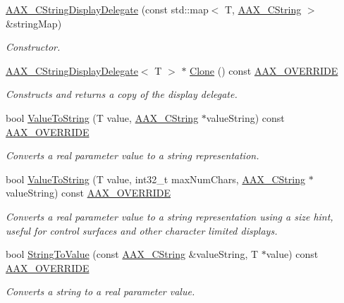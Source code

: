 \begin{DoxyCompactItemize}
\item 
\mbox{\hyperlink{a01581_a675d5d95e04e023b0650c621ddaf4972}{A\+A\+X\+\_\+\+C\+String\+Display\+Delegate}} (const std\+::map$<$ T, \mbox{\hyperlink{a01573}{A\+A\+X\+\_\+\+C\+String}} $>$ \&string\+Map)
\begin{DoxyCompactList}\small\item\em Constructor. \end{DoxyCompactList}\item 
\mbox{\hyperlink{a01581}{A\+A\+X\+\_\+\+C\+String\+Display\+Delegate}}$<$ T $>$ $\ast$ \mbox{\hyperlink{a01581_a011fc2e134ffa0469ee995232922bcb2}{Clone}} () const \mbox{\hyperlink{a00392_ac2f24a5172689ae684344abdcce55463}{A\+A\+X\+\_\+\+O\+V\+E\+R\+R\+I\+DE}}
\begin{DoxyCompactList}\small\item\em Constructs and returns a copy of the display delegate. \end{DoxyCompactList}\item 
bool \mbox{\hyperlink{a01581_a96ae6bc68f2a2df5224539b4b07f914b}{Value\+To\+String}} (T value, \mbox{\hyperlink{a01573}{A\+A\+X\+\_\+\+C\+String}} $\ast$value\+String) const \mbox{\hyperlink{a00392_ac2f24a5172689ae684344abdcce55463}{A\+A\+X\+\_\+\+O\+V\+E\+R\+R\+I\+DE}}
\begin{DoxyCompactList}\small\item\em Converts a real parameter value to a string representation. \end{DoxyCompactList}\item 
bool \mbox{\hyperlink{a01581_a5b5af0bb407230879e3cf7f952ad4de9}{Value\+To\+String}} (T value, int32\+\_\+t max\+Num\+Chars, \mbox{\hyperlink{a01573}{A\+A\+X\+\_\+\+C\+String}} $\ast$value\+String) const \mbox{\hyperlink{a00392_ac2f24a5172689ae684344abdcce55463}{A\+A\+X\+\_\+\+O\+V\+E\+R\+R\+I\+DE}}
\begin{DoxyCompactList}\small\item\em Converts a real parameter value to a string representation using a size hint, useful for control surfaces and other character limited displays. \end{DoxyCompactList}\item 
bool \mbox{\hyperlink{a01581_a465943be762c4c273eb19f2272800ed0}{String\+To\+Value}} (const \mbox{\hyperlink{a01573}{A\+A\+X\+\_\+\+C\+String}} \&value\+String, T $\ast$value) const \mbox{\hyperlink{a00392_ac2f24a5172689ae684344abdcce55463}{A\+A\+X\+\_\+\+O\+V\+E\+R\+R\+I\+DE}}
\begin{DoxyCompactList}\small\item\em Converts a string to a real parameter value. \end{DoxyCompactList}\end{DoxyCompactItemize}
